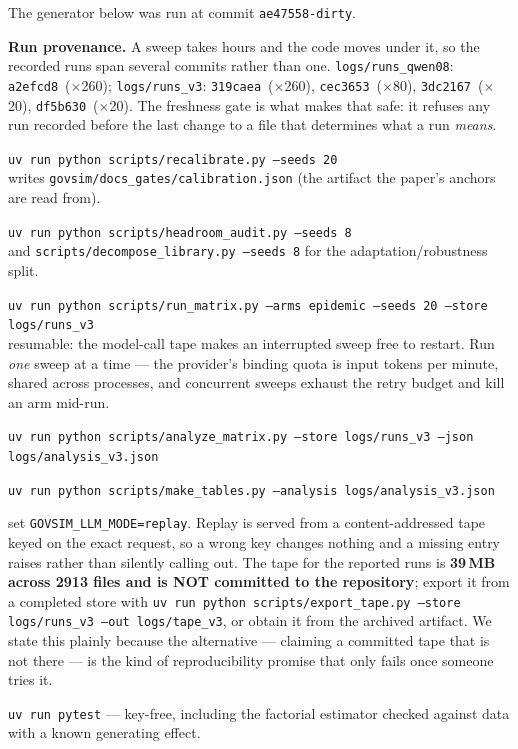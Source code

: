 \noindent The generator below was run at commit \texttt{ae47558-dirty}.

\providecommand{\FreshnessGateRef}{}

\noindent\textbf{Run provenance.} A sweep takes hours and the code moves under it, so the recorded runs span several commits rather than one. \texttt{logs/runs\_qwen08}: \texttt{a2efcd8}~($\times$260); \texttt{logs/runs\_v3}: \texttt{319caea}~($\times$260), \texttt{cec3653}~($\times$80), \texttt{3dc2167}~($\times$20), \texttt{df5b630}~($\times$20). The freshness gate \FreshnessGateRef{} is what makes that safe: it refuses any run recorded before the last change to a file that determines what a run \emph{means}.


\begin{description}[leftmargin=0em,style=nextline]
\item[Calibrate the anchors] \texttt{uv run python scripts/recalibrate.py --seeds 20}
  \\writes \texttt{govsim/docs\_gates/calibration.json} (the artifact the paper's anchors are read from).
\item[Measure headroom across regimes] \texttt{uv run python scripts/headroom\_audit.py --seeds 8}
  \\and \texttt{scripts/decompose\_library.py --seeds 8} for the adaptation/robustness split.
\item[Run the matrix] \texttt{uv run python scripts/run\_matrix.py --arms epidemic --seeds 20 --store logs/runs\_v3}
  \\resumable: the model-call tape makes an interrupted sweep free to restart. Run \emph{one}
  sweep at a time --- the provider's binding quota is input tokens per minute, shared across
  processes, and concurrent sweeps exhaust the retry budget and kill an arm mid-run.
\item[Analyse] \texttt{uv run python scripts/analyze\_matrix.py --store logs/runs\_v3 --json logs/analysis\_v3.json}
\item[Regenerate these tables] \texttt{uv run python scripts/make\_tables.py --analysis logs/analysis\_v3.json}
\item[Replay without an API key] set \texttt{GOVSIM\_LLM\_MODE=replay}. Replay is served from a
  content-addressed tape keyed on the exact request, so a wrong key changes nothing and a missing
  entry raises rather than silently calling out. The tape for the reported runs is
  \textbf{39\,MB across 2913 files and is NOT committed to the repository}; export it from a
  completed store with \texttt{uv run python scripts/export\_tape.py --store logs/runs\_v3 --out logs/tape\_v3},
  or obtain it from the archived artifact. We state this plainly because the alternative --- claiming
  a committed tape that is not there --- is the kind of reproducibility promise that only fails once
  someone tries it.
\item[Tests] \texttt{uv run pytest} --- key-free, including the factorial estimator checked
  against data with a known generating effect.
\end{description}
